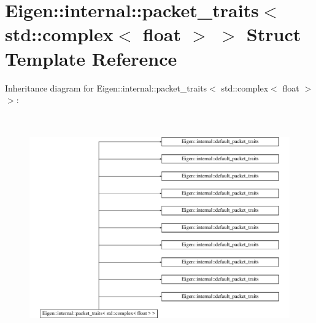 \hypertarget{struct_eigen_1_1internal_1_1packet__traits_3_01std_1_1complex_3_01float_01_4_01_4}{}\section{Eigen\+:\+:internal\+:\+:packet\+\_\+traits$<$ std\+:\+:complex$<$ float $>$ $>$ Struct Template Reference}
\label{struct_eigen_1_1internal_1_1packet__traits_3_01std_1_1complex_3_01float_01_4_01_4}
Inheritance diagram for Eigen\+:\+:internal\+:\+:packet\+\_\+traits$<$ std\+:\+:complex$<$ float $>$ $>$\+:\begin{figure}[H]
\begin{center}
\leavevmode
\includegraphics[height=9.716088cm]{struct_eigen_1_1internal_1_1packet__traits_3_01std_1_1complex_3_01float_01_4_01_4}
\end{center}
\end{figure}
